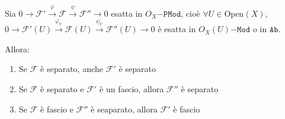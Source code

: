     \begin{lemma}{}
        Sia \(0 \to \mathcal{F}' \overset{\varphi }{\to} \mathcal{F}
        \overset{\psi}{\to} \mathcal{F}'' \to 0\) esatta in
        \(O_X\mathtt{-PMod}\), cioè \(\forall U \in \mathrm{Open}{(X)}\), \(0
        \to \mathcal{F}'{(U)} \overset{\varphi _U}{\to} \mathcal{F}{(U)}
        \overset{\psi_U}{\to} \mathcal{F}''{(U)} \to 0\) è esatta in
        \(O_X{(U)}\mathtt{-Mod}\) o in \(\mathtt{Ab}\).

        Allora:
\begin{enumerate}[label = \arabic*)]
    \item Se \(\mathcal{F}\) è separato, anche \(\mathcal{F}'\) è separato
    \item Se \(\mathcal{F}\) è separato e \(\mathcal{F}'\) è un fascio, allora
        \(\mathcal{F}''\) è separato
    \item Se \(\mathcal{F}\) è fascio e \(\mathcal{F}''\) è seaparato, allora
        \(\mathcal{F}'\) è fascio
\end{enumerate}
    \end{lemma}

